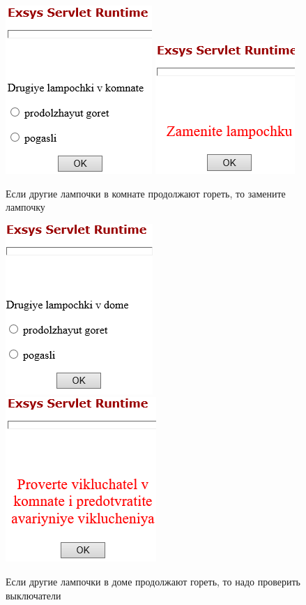 \documentclass[14pt,a4paper,report]{report}
\begin{document}
\begin{figure}[ht!]
	\includegraphics[width=.40\textwidth]{images/3_4.png}\hfill
	\includegraphics[width=.45\textwidth]{images/3_5.png}
	\caption{Если другие лампочки в комнате продолжают гореть, то замените лампочку}
\end{figure}

\begin{figure}[ht!]
	\includegraphics[width=.40\textwidth]{images/3_6.png}\hfill
	\includegraphics[width=.45\textwidth]{images/3_7.png}
	\caption{Если другие лампочки в доме продолжают гореть, то надо проверить выключатели}
\end{figure}
\end{document}
